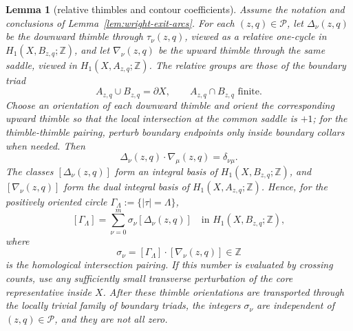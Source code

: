 \documentclass[reqno]{article}
\newtheorem{lem}[theorem]{Lemma}
\theoremstyle{definition}
\theoremstyle{remark}
\theoremstyle{plain}
\begin{document}
\begin{lem}[relative thimbles and contour coefficients]\label{lem:wright-thimble-basis}
Assume the notation and conclusions of Lemma~\ref{lem:wright-exit-arcs}. For each $(z,q)\in\mathcal P$, let $\Delta_\nu(z,q)$ be the downward thimble through $\tau_\nu(z,q)$, viewed as a relative one-cycle in $H_1(X,B_{z,q};\mathbb Z)$, and let $\nabla_\nu(z,q)$ be the upward thimble through the same saddle, viewed in $H_1(X,A_{z,q};\mathbb Z)$. The relative groups are those of the boundary triad
$$A_{z,q}\cup B_{z,q}=\partial X,\qquad A_{z,q}\cap B_{z,q}\text{ finite}.$$
Choose an orientation of each downward thimble and orient the corresponding upward thimble so that the local intersection at the common saddle is $+1$; for the thimble-thimble pairing, perturb boundary endpoints only inside boundary collars when needed. Then
$$\Delta_\nu(z,q)\cdot\nabla_\mu(z,q)=\delta_{\nu\mu}.$$
The classes $[\Delta_\nu(z,q)]$ form an integral basis of $H_1(X,B_{z,q};\mathbb Z)$, and $[\nabla_\nu(z,q)]$ form the dual integral basis of $H_1(X,A_{z,q};\mathbb Z)$. Hence, for the positively oriented circle $\Gamma_\Lambda:=\{|\tau|=\Lambda\}$,
$$[\Gamma_\Lambda]=\sum_{\nu=0}^m\sigma_\nu[\Delta_\nu(z,q)]
\quad\text{in }H_1(X,B_{z,q};\mathbb Z),$$
where
$$\sigma_\nu=[\Gamma_\Lambda]\cdot[\nabla_\nu(z,q)]\in\mathbb Z$$
is the homological intersection pairing. If this number is evaluated by crossing counts, use any sufficiently small transverse perturbation of the core representative inside $X$.
After these thimble orientations are transported through the locally trivial family of boundary triads, the integers $\sigma_\nu$ are independent of $(z,q)\in\mathcal P$, and they are not all zero.
\end{lem}
\end{document}
